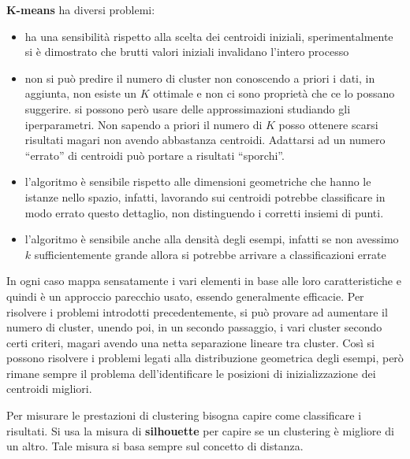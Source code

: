 \textbf{K-means} ha diversi problemi:
\begin{itemize}
    \item ha una sensibilità rispetto alla scelta dei centroidi iniziali,
    sperimentalmente si è dimostrato che brutti valori iniziali invalidano l'intero
    processo
    \item non si può predire il numero di cluster non conoscendo a priori i dati, 
    in aggiunta, non esiste un $K$ ottimale e non ci sono proprietà che ce lo possano 
    suggerire. si possono però usare delle approssimazioni studiando gli iperparametri. 
    Non sapendo a priori il numero di $K$ posso ottenere scarsi risultati magari non
    avendo abbastanza centroidi. Adattarsi ad un numero “errato” di centroidi può
    portare a risultati “sporchi”.
    \item l'algoritmo è sensibile rispetto alle dimensioni geometriche che hanno
    le istanze nello spazio, infatti, lavorando sui centroidi potrebbe classificare in modo
    errato questo dettaglio, non distinguendo i corretti insiemi di punti. 
    \item l'algoritmo è sensibile anche alla densità degli esempi, infatti se non
    avessimo $k$ sufficientemente grande allora si potrebbe arrivare a classificazioni
    errate
\end{itemize}

In ogni caso mappa sensatamente i vari elementi in base alle loro caratteristiche
e quindi è un approccio parecchio usato, essendo generalmente efficacie. Per risolvere
i problemi introdotti precedentemente, si può provare ad aumentare il numero di 
cluster, unendo poi, in un secondo passaggio, i vari cluster secondo certi criteri, 
magari avendo una netta separazione lineare tra cluster. Così si possono risolvere
i problemi legati alla distribuzione geometrica degli esempi, però rimane sempre
il problema dell'identificare le posizioni di inizializzazione dei centroidi migliori.

Per misurare le prestazioni di clustering bisogna capire come classificare i
risultati. Si usa la misura di \textbf{silhouette} per capire se un clustering è
migliore di un altro. Tale misura si basa sempre sul concetto di distanza.

